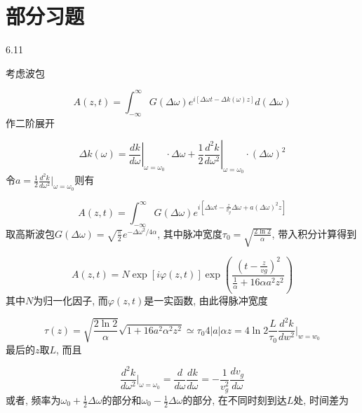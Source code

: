 

    
\section*{部分习题}





6.11

考虑波包

\[A(z, t)=\int_{-\infty}^{\infty} G(\Delta \omega) e^{i[\Delta \omega t-\Delta k(\omega) z]} d(\Delta\omega) \]
作二阶展开

\[\Delta k(\omega)=\left.\frac{d k}{d \omega}\right|_{\omega=\omega_{0}} \cdot \Delta \omega+\frac{1}{2}\left.\frac{d^{2} k}{d \omega^{2}}\right|_{\omega=\omega_{0}} \cdot(\Delta \omega)^{2} \]
令\(a=\frac{1}{2} \frac{d^{2} k}{d \omega^{2}} \Big|_{\omega=\omega_0}\)则有

\[A(z, t)=\int_{-\infty}^{\infty} G(\Delta \omega) e^{i\left[\Delta \omega t-\frac{z}{v_{g}} \Delta \omega+a(\Delta \omega)^{2} z\right]} \]
取高斯波包\(G(\Delta \omega)=\sqrt{\frac{\pi}{2}} e^{-\Delta \omega^{2} / 4 \alpha}\), 其中脉冲宽度\(\tau_{0}=\sqrt{\frac{2 \ln 2}{\alpha}}\), 带入积分计算得到

\[A(z, t)=N \exp [i \varphi(z, t)] \exp \left(\frac{\left(t-\frac{z}{v g}\right)^{2}}{\frac{1}{\alpha}+16 \alpha a^{2} z^{2}}\right) \]
其中\(N\)为归一化因子, 而\(\varphi(z,t)\)是一实函数, 由此得脉冲宽度

\[\tau(z)=\sqrt{\frac{2 \ln 2}{\alpha}} \sqrt{1+16 a^{2} \alpha^{2} z^{2}}\simeq \tau_{0} 4 |a|\alpha z=4 \ln 2 \frac{L}{\tau_{0}} \frac{d^{2} k}{d w^{2}}\bigg|_{w=w_{0}} \]
最后的\(z\)取\(L\), 而且

\[\frac{d^{2} k}{d \omega^{2}}\bigg|_{\omega=\omega_{0}}= \frac{d}{d \omega} \frac{d k}{d \omega}=-\frac{1}{v_{g}^{2}} \frac{d v_{g}}{d \omega} \]
或者, 频率为\(\omega_{0}+\frac{1}{2} \Delta \omega\)的部分和\(\omega_{0}-\frac{1}{2} \Delta \omega\)的部分, 在不同时刻到达\(L\)处, 时间差为

